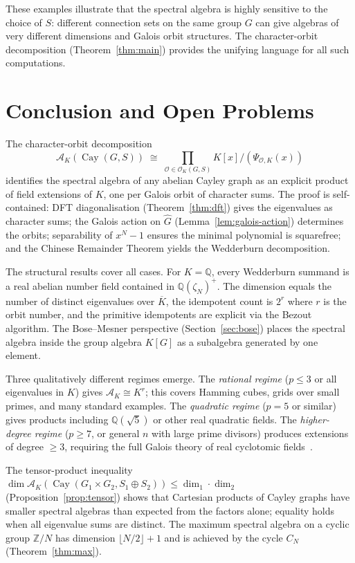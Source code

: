 \documentclass[12pt]{amsart}
\numberwithin{equation}{section}
\theoremstyle{plain}
\theoremstyle{definition}
\DeclareMathOperator{\Cay}{Cay}
\newcommand{\Z}{\mathbb{Z}}
\newcommand{\Q}{\mathbb{Q}}
\newcommand{\calA}{\mathcal{A}}
\newcommand{\calO}{\mathcal{O}}
\newcommand{\Ghat}{\widehat{G}}
\begin{document}
These examples illustrate that the spectral algebra is highly sensitive to
the choice of $S$: different connection sets on the same group $G$ can
give algebras of very different dimensions and Galois orbit structures.
The character-orbit decomposition (Theorem~\ref{thm:main}) provides the
unifying language for all such computations.

\section{Conclusion and Open Problems}
\label{sec:conc}

The character-orbit decomposition
\[
  \calA_K(\Cay(G,S)) \;\cong\;
  \prod_{\calO \in \calO_K(G,S)} K[x]/(\Psi_{\calO,K}(x))
\]
identifies the spectral algebra of any abelian Cayley graph as an explicit
product of field extensions of $K$, one per Galois orbit of character sums.
The proof is self-contained: DFT diagonalisation (Theorem~\ref{thm:dft})
gives the eigenvalues as character sums; the Galois action on $\Ghat$
(Lemma~\ref{lem:galois-action}) determines the orbits; separability of
$x^N - 1$ ensures the minimal polynomial is squarefree; and the Chinese
Remainder Theorem yields the Wedderburn decomposition.

The structural results cover all cases.  For $K = \Q$, every Wedderburn
summand is a real abelian number field contained in $\Q(\zeta_N)^+$.
The dimension equals the number of distinct eigenvalues over $\overline{K}$,
the idempotent count is $2^r$ where $r$ is the orbit number, and the
primitive idempotents are explicit via the Bezout algorithm.  The
Bose--Mesner perspective (Section~\ref{sec:bose}) places the spectral
algebra inside the group algebra $K[G]$ as a subalgebra generated by one
element.

Three qualitatively different regimes emerge.  The \emph{rational regime}
($p \le 3$ or all eigenvalues in $K$) gives $\calA_K \cong K^r$; this
covers Hamming cubes, grids over small primes, and many standard examples.
The \emph{quadratic regime} ($p = 5$ or similar) gives products including
$\Q(\sqrt{5})$ or other real quadratic fields.  The \emph{higher-degree
regime} ($p \ge 7$, or general $n$ with large prime divisors) produces
extensions of degree $\ge 3$, requiring the full Galois theory of real
cyclotomic fields~\cite{Was97}.

The tensor-product inequality
$\dim \calA_K(\Cay(G_1 \times G_2, S_1 \oplus S_2)) \le \dim_1 \cdot \dim_2$
(Proposition~\ref{prop:tensor}) shows that Cartesian products of Cayley
graphs have smaller spectral algebras than expected from the factors alone;
equality holds when all eigenvalue sums are distinct.  The maximum
spectral algebra on a cyclic group $\Z/N$ has dimension $\lfloor N/2\rfloor
+ 1$ and is achieved by the cycle $C_N$ (Theorem~\ref{thm:max}).
\end{document}
